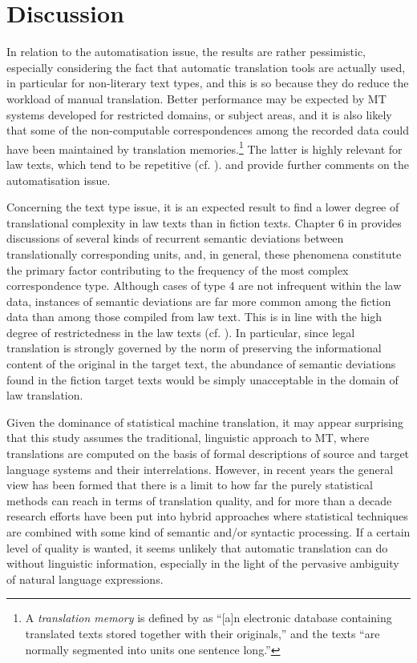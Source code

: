 \documentclass[output=paper]{LSP/langsci}
\begin{document}
\section{Discussion}\label{sec:thunes:5}

In relation to the automatisation issue, the results are rather pessimistic, especially considering the fact that automatic translation tools are actually used, in particular for non-literary text types, and this is so because they do reduce the workload of manual translation. Better performance may be expected by MT systems developed for restricted domains, or subject areas, and it is also likely that some of the non-computable correspondences among the recorded data could have been maintained by translation memories.\footnote{A \textit{translation memory} is defined by \citet[127--128]{Palumbo2009} as ``[a]n electronic database containing translated texts stored together with their originals,'' and the texts ``are normally segmented into units one sentence long.''} The latter is highly relevant for law texts, which tend to be repetitive (cf. ).  and  provide further comments on the automatisation issue. 

Concerning the text type issue, it is an expected result to find a lower degree of translational complexity in law texts than in fiction texts. Chapter 6 in \citet{Thunes2011} provides discussions of several kinds of recurrent semantic deviations between translationally corresponding units, and, in general, these phenomena constitute the primary factor contributing to the frequency of the most complex correspondence type. Although cases of type 4 are not infrequent within the law data, instances of semantic deviations are far more common among the fiction data than among those compiled from law text. This is in line with the high degree of restrictedness in the law texts (cf. ). In particular, since legal translation is strongly governed by the norm of preserving the informational content of the original in the target text, the abundance of semantic deviations found in the fiction target texts would be simply unacceptable in the domain of law translation. 

Given the dominance of statistical machine translation, it may appear surprising that this study assumes the traditional, linguistic approach to MT, where translations are computed on the basis of formal descriptions of source and target language systems and their interrelations. However, in recent years the general view has been formed that there is a limit to how far the purely statistical methods can reach in terms of translation quality, and for more than a decade research efforts have been put into hybrid approaches where statistical techniques are combined with some kind of semantic and/or syntactic processing. If a certain level of quality is wanted, it seems unlikely that automatic translation can do without linguistic information, especially in the light of the pervasive ambiguity of natural language expressions.
\end{document}
